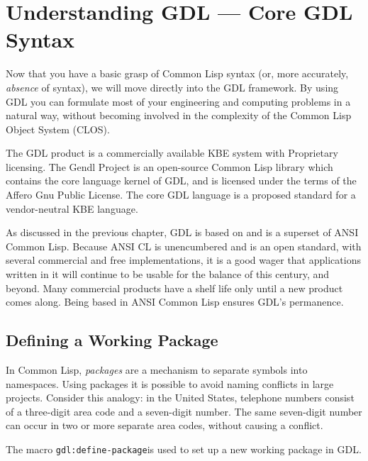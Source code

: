 \documentclass [11pt]{book}
\begin{document}
\chapter{Understanding GDL --- Core GDL Syntax}

\label{chap:understandinggdl---coregdlsyntax}



Now that you have a basic grasp of Common Lisp syntax (or, more accurately, \emph{absence} of syntax), we will move directly into the GDL
framework. By using GDL you can formulate most of your engineering and
computing problems in a natural way, without becoming involved in the
complexity of the Common Lisp Object System (CLOS).



The GDL product is a commercially available KBE system with
Proprietary licensing.  The Gendl Project is an open-source Common
Lisp library which contains the core language kernel of GDL, and is
licensed under the terms of the Affero Gnu Public License. The core
GDL language is a proposed standard for a vendor-neutral KBE
language.



As discussed in the previous chapter, GDL is based on and
is a superset of ANSI Common Lisp. Because ANSI CL is unencumbered and
is an open standard, with several commercial and free implementations, it
is a good wager that applications written in it will continue to be
usable for the balance of this century, and beyond. Many commercial 
products have a shelf life only until a new product comes along. Being
based in ANSI Common Lisp ensures GDL's permanence.



\section{Defining a Working Package}

\label{sec:definingaworkingpackage}



In Common Lisp, \emph{packages} are a mechanism to separate symbols into
namespaces. Using packages it is possible to avoid naming conflicts in
large projects. Consider this analogy: in the United States, telephone
numbers consist of a three-digit area code and a seven-digit
number. The same seven-digit number can occur in two or more separate
area codes, without causing a conflict.



The macro \texttt{gdl:define-package}is used to set up a new working package in GDL.
\end{document}
